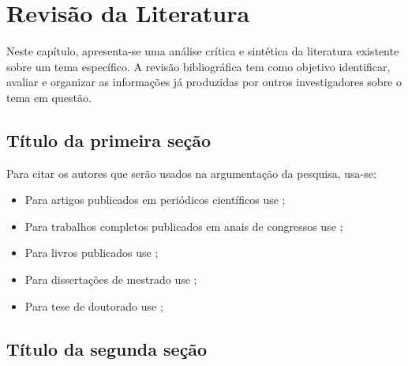 \chapter{Revis\~ao da Literatura}
\label{chapter:tema1}

Neste capítulo, apresenta-se uma análise crítica e sintética da literatura existente sobre um tema específico. A revisão bibliográfica tem como objetivo identificar, avaliar e organizar as informações já produzidas por outros investigadores sobre o tema em questão.



\section{T\'itulo da primeira se\c{c}\~ao}
\label{section:titulo21}

Para citar os autores que ser\~ao usados na argumenta\c{c}\~ao da
pesquisa, usa-se:

\begin{itemize}
  \item Para artigos publicados em peri\'odicos cient\'ificos use
  \cite{Autor1998};
  \item Para trabalhos completos publicados em anais de congressos
  use \cite{AutorEtAl1999};
  \item Para livros publicados use \cite{Autor2005};
  \item Para disserta\c{c}\~oes de mestrado use \cite{Autor2009};
  \item Para tese de doutorado use \cite{Autor2002};
\end{itemize}


\section{T\'itulo da segunda se\c{c}\~ao}
\label{section:titulo22}

